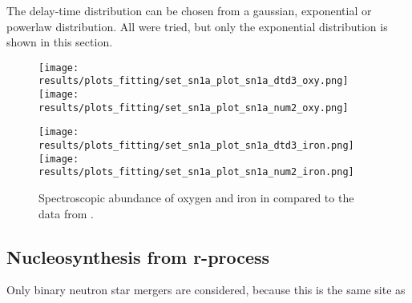 The delay-time distribution can be chosen from a gaussian, exponential or powerlaw distribution.
All were tried, but only the exponential distribution is shown in this section.

\begin{figure}[h]
  \begin{minipage}[h][][t]{0.49\textwidth}
    \centering
    \texttt{[image: results/plots\_fitting/set\_sn1a\_plot\_sn1a\_dtd3\_oxy.png]}
    \texttt{[image: results/plots\_fitting/set\_sn1a\_plot\_sn1a\_num2\_oxy.png]}
  \end{minipage}
  \begin{minipage}[h][][t]{0.49\textwidth}
    \centering
    \texttt{[image: results/plots\_fitting/set\_sn1a\_plot\_sn1a\_dtd3\_iron.png]}
    \texttt{[image: results/plots\_fitting/set\_sn1a\_plot\_sn1a\_num2\_iron.png]}
  \end{minipage}
  \caption[Fit of type 1a supernovae \fiduccialomega]{\label{fig:fit-sn1a}
    Spectroscopic abundance of oxygen and iron in \omegamodel compared to the data from \eris.
    \\ 
  }
\end{figure}

\begin{table}[h]
  \caption[\omegamodel-parameters from fitting stars and supernovae to \eris]{
    \label{tab:fitting-parameters-sn1a}
  }
\end{table}
\FloatBarrier

\subsection{Nucleosynthesis from r-process}
Only binary neutron star mergers are considered, because this is the same site as 

